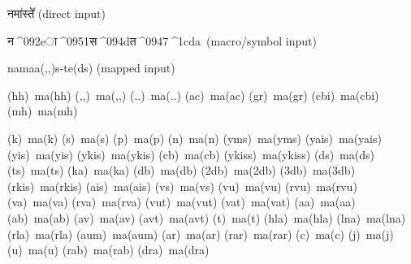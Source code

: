 \documentclass[12pt,a4paper]{article}
\newcommand\fsname{Shobhika}%
\newcommand\fsktna{न}
\newcommand\fsktma{^^^^092e}
\newcommand\fskthalant{^^^^094d}
\newcommand\fsktsa{स}
\newcommand\fsktta{त}
\newcommand\fskte{^^^^0947}
\newcommand\fsktA{ा}
\newcommand\udatta{^^^^0951}
\newcommand\doublesvarita{^^^^1cda}
\begin{document}
\fsnsk {\feng \fsname\ font:}


नमा॑स्ते᳚ {\feng (direct input)}


\fsktna\fsktma\fsktA\udatta\fsktsa\fskthalant\fsktta\fskte\doublesvarita \ {\feng (macro/symbol input)}


namaa(,,)s-te(ds) {\feng (mapped input)}

\large

{\feng (hh)}~ma(hh)
{\feng (,,)}~ma(,,)
{\feng (..)}~ma(..)
{\feng (ac)}~ma(ac)
{\feng (gr)}~ma(gr)
{\feng (cbi)}~ma(cbi)
{\feng (mh)}~ma(mh)

{\feng (k)}~ma(k)
{\feng (s)}~ma(s)
{\feng (p)}~ma(p)
{\feng (n)}~ma(n)
{\feng (yms)}~ma(yms)
{\feng (yais)}~ma(yais)
{\feng (yis)}~ma(yis)
{\feng (ykis)}~ma(ykis)
{\feng (cb)}~ma(cb)
{\feng (ykiss)}~ma(ykiss)
{\feng (ds)}~ma(ds)
{\feng (ts)}~ma(ts)
{\feng (ka)}~ma(ka)
{\feng (db)}~ma(db)
{\feng (2db)}~ma(2db)
{\feng (3db)}~ma(3db)
{\feng (rkis)}~ma(rkis)
{\feng (ais)}~ma(ais)
{\feng (vs)}~ma(vs)
{\feng (vu)}~ma(vu)
{\feng (rvu)}~ma(rvu)
{\feng (va)}~ma(va)
{\feng (rva)}~ma(rva)
{\feng (vut)}~ma(vut)
{\feng (vat)}~ma(vat)
{\feng (aa)}~ma(aa)
{\feng (ab)}~ma(ab)
{\feng (av)}~ma(av)
{\feng (avt)}~ma(avt)
{\feng (t)}~ma(t)
{\feng (hla)}~ma(hla)
{\feng (lna)}~ma(lna)
{\feng (rla)}~ma(rla)
{\feng (aum)}~ma(aum)
{\feng (ar)}~ma(ar)
{\feng (rar)}~ma(rar)
{\feng (c)}~ma(c)
{\feng (j)}~ma(j)
{\feng (u)}~ma(u)
{\feng (rab)}~ma(rab)
{\feng (dra)}~ma(dra)
\end{document}
